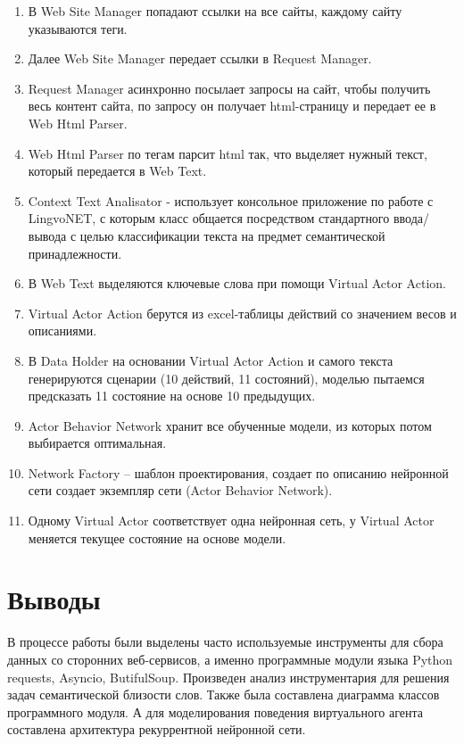 \begin{enumerate}
  \item	В Web Site Manager попадают ссылки на все сайты, каждому сайту указываются теги.
  \item	Далее Web Site Manager передает ссылки в Request Manager.
  \item	Request Manager асинхронно посылает запросы на сайт, чтобы получить весь контент сайта, по запросу он получает html-страницу и передает ее в Web Html Parser.
  \item	Web Html Parser по тегам парсит html так, что выделяет нужный текст, который передается в Web Text.
  \item	Context Text Analisator -  использует консольное приложение по работе с LingvoNET, с которым класс общается посредством стандартного ввода/вывода с целью классификации текста на предмет семантической принадлежности.
  \item	В Web Text выделяются ключевые слова при помощи Virtual Actor Action.
  \item	Virtual Actor Action берутся из excel-таблицы действий со значением весов и описаниями.
  \item	В Data Holder на основании Virtual Actor Action и самого текста генерируются сценарии (10 действий, 11 состояний), моделью пытаемся предсказать 11 состояние на основе 10 предыдущих.
  \item	Actor Behavior Network хранит все обученные модели, из которых потом выбирается оптимальная.
  \item	Network Factory – шаблон проектирования, создает по описанию нейронной сети создает экземпляр сети (Actor Behavior Network).
  \item	Одному Virtual Actor соответствует одна нейронная сеть, у Virtual Actor меняется текущее состояние на основе модели. 
\end{enumerate}

\section{Выводы}

В процессе работы были выделены часто используемые инструменты для сбора данных со сторонних веб-сервисов, 
а именно программные модули языка Python requests, Asyncio, ButifulSoup. 
Произведен анализ инструментария для решения задач семантической близости слов. 
Также была составлена диаграмма классов программного модуля. 
А для моделирования поведения виртуального агента составлена архитектура рекуррентной нейронной сети.



